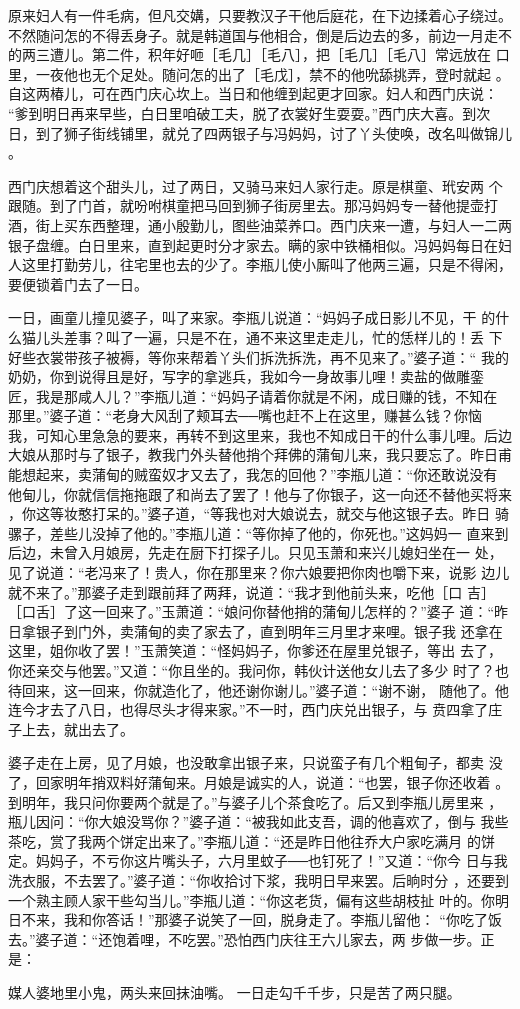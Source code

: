 原来妇人有一件毛病，但凡交媾，只要教汉子干他后庭花，在下边揉着心子绕过。
不然随问怎的不得丢身子。就是韩道国与他相合，倒是后边去的多，前边一月走不
的两三遭儿。第二件，积年好咂［毛几］［毛八］，把［毛几］［毛八］常远放在
口里，一夜他也无个足处。随问怎的出了［毛戊］，禁不的他吮舔挑弄，登时就起
。自这两椿儿，可在西门庆心坎上。当日和他缠到起更才回家。妇人和西门庆说：
“爹到明日再来早些，白日里咱破工夫，脱了衣裳好生耍耍。”西门庆大喜。到次
日，到了狮子街线铺里，就兑了四两银子与冯妈妈，讨了丫头使唤，改名叫做锦儿
。

西门庆想着这个甜头儿，过了两日，又骑马来妇人家行走。原是棋童、玳安两
个跟随。到了门首，就吩咐棋童把马回到狮子街房里去。那冯妈妈专一替他提壶打
酒，街上买东西整理，通小殷勤儿，图些油菜养口。西门庆来一遭，与妇人一二两
银子盘缠。白日里来，直到起更时分才家去。瞒的家中铁桶相似。冯妈妈每日在妇
人这里打勤劳儿，往宅里也去的少了。李瓶儿使小厮叫了他两三遍，只是不得闲，
要便锁着门去了一日。

一日，画童儿撞见婆子，叫了来家。李瓶儿说道：“妈妈子成日影儿不见，干
的什么猫儿头差事？叫了一遍，只是不在，通不来这里走走儿，忙的恁样儿的！丢
下好些衣裳带孩子被褥，等你来帮着丫头们拆洗拆洗，再不见来了。”婆子道：“
我的奶奶，你到说得且是好，写字的拿逃兵，我如今一身故事儿哩！卖盐的做雕銮
匠，我是那咸人儿？”李瓶儿道：“妈妈子请着你就是不闲，成日赚的钱，不知在
那里。”婆子道：“老身大风刮了颊耳去──嘴也赶不上在这里，赚甚么钱？你恼
我，可知心里急急的要来，再转不到这里来，我也不知成日干的什么事儿哩。后边
大娘从那时与了银子，教我门外头替他捎个拜佛的蒲甸儿来，我只要忘了。昨日甫
能想起来，卖蒲甸的贼蛮奴才又去了，我怎的回他？”李瓶儿道：“你还敢说没有
他甸儿，你就信信拖拖跟了和尚去了罢了！他与了你银子，这一向还不替他买将来
，你这等妆憨打呆的。”婆子道，“等我也对大娘说去，就交与他这银子去。昨日
骑骡子，差些儿没掉了他的。”李瓶儿道：“等你掉了他的，你死也。”这妈妈一
直来到后边，未曾入月娘房，先走在厨下打探子儿。只见玉萧和来兴儿媳妇坐在一
处，见了说道：“老冯来了！贵人，你在那里来？你六娘要把你肉也嚼下来，说影
边儿就不来了。”那婆子走到跟前拜了两拜，说道：“我才到他前头来，吃他［口
吉］［口舌］了这一回来了。”玉萧道：“娘问你替他捎的蒲甸儿怎样的？”婆子
道：“昨日拿银子到门外，卖蒲甸的卖了家去了，直到明年三月里才来哩。银子我
还拿在这里，姐你收了罢！”玉萧笑道：“怪妈妈子，你爹还在屋里兑银子，等出
去了，你还亲交与他罢。”又道：“你且坐的。我问你，韩伙计送他女儿去了多少
时了？也待回来，这一回来，你就造化了，他还谢你谢儿。”婆子道：“谢不谢，
随他了。他连今才去了八日，也得尽头才得来家。”不一时，西门庆兑出银子，与
贲四拿了庄子上去，就出去了。

婆子走在上房，见了月娘，也没敢拿出银子来，只说蛮子有几个粗甸子，都卖
没了，回家明年捎双料好蒲甸来。月娘是诚实的人，说道：“也罢，银子你还收着
。到明年，我只问你要两个就是了。”与婆子儿个茶食吃了。后又到李瓶儿房里来
，瓶儿因问：“你大娘没骂你？”婆子道：“被我如此支吾，调的他喜欢了，倒与
我些茶吃，赏了我两个饼定出来了。”李瓶儿道：“还是昨日他往乔大户家吃满月
的饼定。妈妈子，不亏你这片嘴头子，六月里蚊子──也钉死了！”又道：“你今
日与我洗衣服，不去罢了。”婆子道：“你收拾讨下浆，我明日早来罢。后晌时分
，还要到一个熟主顾人家干些勾当儿。”李瓶儿道：“你这老货，偏有这些胡枝扯
叶的。你明日不来，我和你答话！”那婆子说笑了一回，脱身走了。李瓶儿留他：
“你吃了饭去。”婆子道：“还饱着哩，不吃罢。”恐怕西门庆往王六儿家去，两
步做一步。正是：

媒人婆地里小鬼，两头来回抹油嘴。
一日走勾千千步，只是苦了两只腿。
